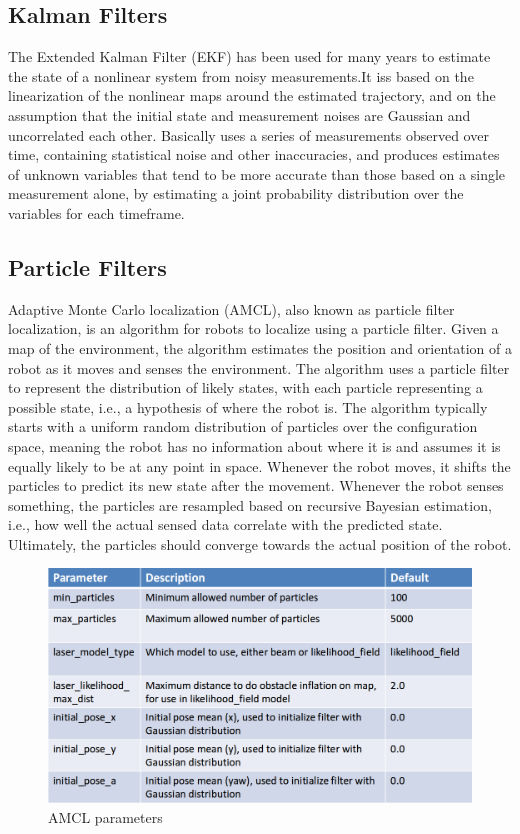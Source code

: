 \documentclass[10pt,journal,compsoc]{IEEEtran}
\begin{document}
    

    \subsection{Kalman Filters}
    The Extended Kalman Filter (EKF) has been used for many years to estimate the state of a nonlinear system from noisy measurements.It iss based on the linearization of the nonlinear maps around the estimated trajectory, and on the assumption that the initial state and measurement noises are Gaussian and uncorrelated each other. Basically uses a series of measurements observed over time, containing statistical noise and other inaccuracies, and produces estimates of unknown variables that tend to be more accurate than those based on a single measurement alone, by estimating a joint probability distribution over the variables for each timeframe.

    \subsection{Particle Filters}
    Adaptive Monte Carlo localization (AMCL), also known as particle filter localization, is an algorithm for robots to localize using a particle filter. Given a map of the environment, the algorithm estimates the position and orientation of a robot as it moves and senses the environment. The algorithm uses a particle filter to represent the distribution of likely states, with each particle representing a possible state, i.e., a hypothesis of where the robot is. The algorithm typically starts with a uniform random distribution of particles over the configuration space, meaning the robot has no information about where it is and assumes it is equally likely to be at any point in space. Whenever the robot moves, it shifts the particles to predict its new state after the movement. Whenever the robot senses something, the particles are resampled based on recursive Bayesian estimation, i.e., how well the actual sensed data correlate with the predicted state. Ultimately, the particles should converge towards the actual position of the robot.


    \begin{figure}[thptb]
        \centering
        \includegraphics[width=\linewidth]{amcl.png}
        \caption{AMCL parameters}
        \label{fig:robot3}
    \end{figure}
    
\end{document}
